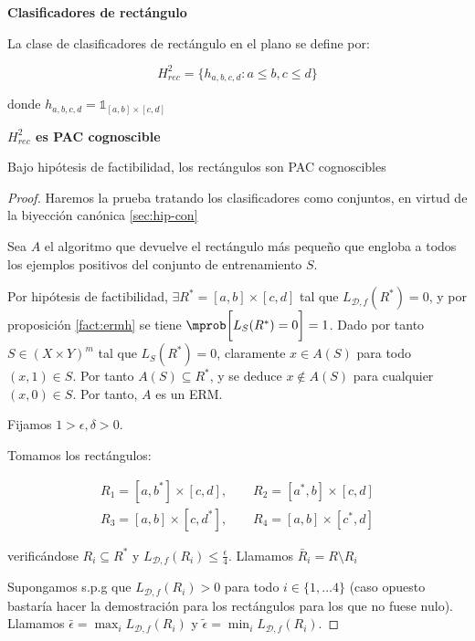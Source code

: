 \begin{example}
  \begin{definition} \textbf{Clasificadores de rectángulo}

  La clase de clasificadores de rectángulo en el plano se define por:

  \[H^2_{rec} = \{ h_{a,b,c,d}: a\le b, c\le d\}\]

  donde $h_{a,b,c,d} = \mathds{1}_{[a,b]\times [c,d]}$
  \end{definition}


  \begin{fact} \textbf{$H_{rec}^2$ es PAC cognoscible}

  Bajo hipótesis de factibilidad, los rectángulos son PAC cognoscibles
  \end{fact}

    \begin{proof}
    Haremos la prueba tratando los clasificadores como conjuntos, en virtud de la biyección canónica \eqref{sec:hip-con}
    
    Sea $A$ el algoritmo que devuelve el rectángulo más pequeño que engloba a todos los ejemplos positivos del conjunto 
    de entrenamiento $S$.

    Por hipótesis de factibilidad, $\exists R^\ast = [a,b]\times [c,d]$ tal que $L_{\mathcal{D},f}(R^\ast) = 0$, y por 
    proposición \ref{fact:ermh} se tiene $\mprob \bigg[L_S(R^\ast) = 0 \bigg] = 1$. 
    Dado por tanto $S \in (X\times Y)^m$ tal que $L_S(R^\ast) = 0$, claramente $x \in A(S)$ para 
    todo $(x,1)\in S$. Por tanto $A(S) \subseteq R^\ast$, y se deduce $x \notin A(S)$ para 
    cualquier $(x,0)\in S$. Por tanto, $A$ es un ERM.

    Fijamos $1 > \epsilon, \delta > 0$.

    Tomamos los rectángulos:
    
    \begin{align*} 
    R_1 = [a,b^{\ast}] \times [c,d], \qquad R_2= [a^{\ast},b] \times [c,d] \\ 
    R_3=[a,b] \times [c,d^{\ast}],   \qquad R_4=[a,b] \times [c^{\ast},d]     
    \end{align*}
 
    verificándose $R_i \subseteq R^\ast$ y $L_{\mathcal{D},f}(R_i) \le \frac{\epsilon}{4}$. Llamamos 
    $\bar{R}_i = R\setminus R_i$
    
    Supongamos s.p.g que $L_{\mathcal{D},f}(R_i) > 0$ para todo $i\in\{1,\ldots 4\}$ (caso opuesto 
    bastaría hacer la demostración para los rectángulos para los que no fuese nulo). Llamamos 
    $\bar{\epsilon} = \max_i L_{\mathcal{D},f}(R_i)$ y $\widetilde{\epsilon} = \min_i L_{\mathcal{D},f}(R_i)$.


\end{proof}
\end{example}
